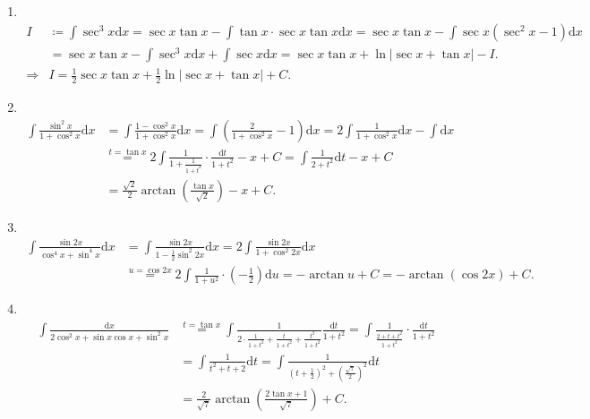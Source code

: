 \begin{solution}
\begin{enumerate}
    \item[31.]\\
    \[
    \begin{aligned}
    I&\coloneqq\int\sec^3{x}\mathrm{d}x=\sec{x}\tan{x}-\int\tan{x}\cdot\sec{x}\tan{x}\mathrm{d}x=\sec{x}\tan{x}-\int\sec{x}(\sec^2{x}-1)\mathrm{d}x\\
    &=\sec{x}\tan{x}-\int\sec^3{x}\mathrm{d}x+\int\sec{x}\mathrm{d}x=\sec{x}\tan{x}+\ln\left|\sec{x}+\tan{x}\right|-I.\\
    \Rightarrow &I=\frac{1}{2}\sec{x}\tan{x}+\frac{1}{2}\ln\left|\sec{x}+\tan{x}\right|+C.
    \end{aligned}
    \]

    \item[32.]\\
    \[
    \begin{aligned}
    \int\frac{\sin^2{x}}{1+\cos^2{x}}\mathrm{d}x&=\int\frac{1-\cos^2{x}}{1+\cos^2{x}}\mathrm{d}x=\int\left(\frac{2}{1+\cos^2{x}}-1\right)\mathrm{d}x=2\int\frac{1}{1+\cos^2{x}}\mathrm{d}x-\int\mathrm{d}x\\
    &\overset{t=\tan{x}}{=}2\int\frac{1}{1+\frac{1}{1+t^2}}\cdot\frac{\mathrm{d}t}{1+t^2}-x+C=\int\frac{1}{2+t^2}\mathrm{d}t-x+C\\
    &=\frac{\sqrt{2}}{2}\arctan\left(\frac{\tan{x}}{\sqrt{2}}\right)-x+C.
    \end{aligned}
    \]

    \item[33.]\\
    \[
    \begin{aligned}
    \int\frac{\sin{2x}}{\cos^4{x}+\sin^4{x}}\mathrm{d}x&=\int\frac{\sin{2x}}{1-\frac{1}{2}\sin^2{2x}}\mathrm{d}x=2\int\frac{\sin{2x}}{1+\cos^2{2x}}\mathrm{d}x\\
    &\overset{u=\cos{2x}}{=}2\int\frac{1}{1+u^2}\cdot\left(-\frac{1}{2}\right)\mathrm{d}u=-\arctan{u}+C=-\arctan\left(\cos{2x}\right)+C.
    \end{aligned}
    \]

    \item[34.]\\
    \[
    \begin{aligned}
    \int\frac{\mathrm{d}x}{2\cos^2{x}+\sin{x}\cos{x}+\sin^2{x}}&\overset{t=\tan{x}}{=}\int\frac{1}{2\cdot\frac{1}{1+t^2}+\frac{t}{1+t^2}+\frac{t^2}{1+t^2}}\frac{\mathrm{d}t}{1+t^2}=\int\frac{1}{\frac{2+t+t^2}{1+t^2}}\cdot\frac{\mathrm{d}t}{1+t^2}\\
    &=\int\frac{1}{t^2+t+2}\mathrm{d}t=\int\frac{1}{\left(t+\frac{1}{2}\right)^2+\left(\frac{\sqrt{7}}{2}\right)^2}\mathrm{d}t\\
    &=\frac{2}{\sqrt{7}}\arctan\left(\frac{2\tan{x}+1}{\sqrt{7}}\right)+C.
    \end{aligned}
    \]


\end{enumerate}
\end{solution}
